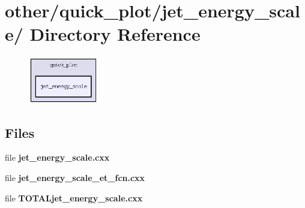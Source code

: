 \section{other/quick\_\-plot/jet\_\-energy\_\-scale/ Directory Reference}
\label{dir_2395cc5206576a6e179b257f0fe54320}


\begin{figure}[H]
\begin{center}
\leavevmode
\includegraphics[width=86pt]{dir_2395cc5206576a6e179b257f0fe54320_dep}
\end{center}
\end{figure}
\subsection*{Files}
\begin{CompactItemize}
\item 
file \textbf{jet\_\-energy\_\-scale.cxx}
\item 
file \textbf{jet\_\-energy\_\-scale\_\-et\_\-fcn.cxx}
\item 
file \textbf{TOTALjet\_\-energy\_\-scale.cxx}
\end{CompactItemize}
